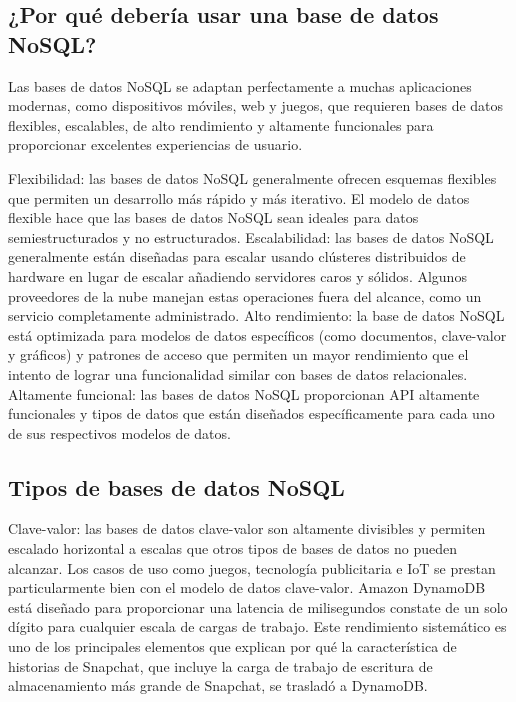 \documentclass[twoside,twocolumn]{article}
\begin{document}
\subsection{¿Por qué debería usar una base de datos NoSQL?}

Las bases de datos NoSQL se adaptan perfectamente a muchas aplicaciones modernas, como dispositivos móviles, web y juegos, que requieren bases de datos flexibles, escalables, de alto rendimiento y altamente funcionales para proporcionar excelentes experiencias de usuario.

Flexibilidad: las bases de datos NoSQL generalmente ofrecen esquemas flexibles que permiten un desarrollo más rápido y más iterativo. El modelo de datos flexible hace que las bases de datos NoSQL sean ideales para datos semiestructurados y no estructurados.
Escalabilidad: las bases de datos NoSQL generalmente están diseñadas para escalar usando clústeres distribuidos de hardware en lugar de escalar añadiendo servidores caros y sólidos. Algunos proveedores de la nube manejan estas operaciones fuera del alcance, como un servicio completamente administrado.
Alto rendimiento: la base de datos NoSQL está optimizada para modelos de datos específicos (como documentos, clave-valor y gráficos) y patrones de acceso que permiten un mayor rendimiento que el intento de lograr una funcionalidad similar con bases de datos relacionales.
Altamente funcional: las bases de datos NoSQL proporcionan API altamente funcionales y tipos de datos que están diseñados específicamente para cada uno de sus respectivos modelos de datos.
 
\subsection{Tipos de bases de datos NoSQL}

Clave-valor: las bases de datos clave-valor son altamente divisibles y permiten escalado horizontal a escalas que otros tipos de bases de datos no pueden alcanzar. Los casos de uso como juegos, tecnología publicitaria e IoT se prestan particularmente bien con el modelo de datos clave-valor. Amazon DynamoDB está diseñado para proporcionar una latencia de milisegundos constate de un solo dígito para cualquier escala de cargas de trabajo. Este rendimiento sistemático es uno de los principales elementos que explican por qué la característica de historias de Snapchat, que incluye la carga de trabajo de escritura de almacenamiento más grande de Snapchat, se trasladó a DynamoDB.
\end{document}
